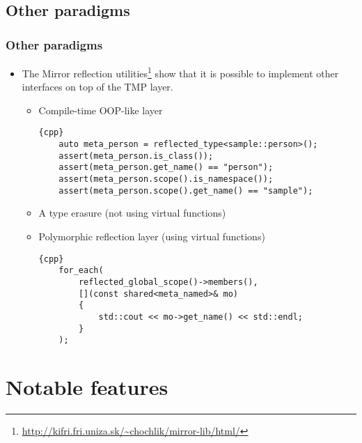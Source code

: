 \documentclass[compress,table,xcolor=table]{beamer}
\begin{document}
\subsection{Other paradigms}
\begin{frame}[fragile]
\frametitle{Other paradigms}
  \begin{itemize}
    \item The Mirror reflection utilities\footnote
      {\tiny{\url{http://kifri.fri.uniza.sk/~chochlik/mirror-lib/html/}}}
      show that it is possible to implement other interfaces on top of the TMP layer.
      \begin{itemize}
        \small
        \item Compile-time OOP-like layer
        \begin{lstlisting}{cpp}
	auto meta_person = reflected_type<sample::person>();
	assert(meta_person.is_class());
	assert(meta_person.get_name() == "person");
	assert(meta_person.scope().is_namespace());
	assert(meta_person.scope().get_name() == "sample");
        \end{lstlisting}
	\item A type erasure (not using virtual functions)
	\item Polymorphic reflection layer (using virtual functions)
        \begin{lstlisting}{cpp}
	for_each(
	    reflected_global_scope()->members(),
	    [](const shared<meta_named>& mo)
	    {
	        std::cout << mo->get_name() << std::endl;
	    }
	);
        \end{lstlisting}
      \end{itemize}
  \end{itemize}
\end{frame}

\section{Notable features}
\end{document}
